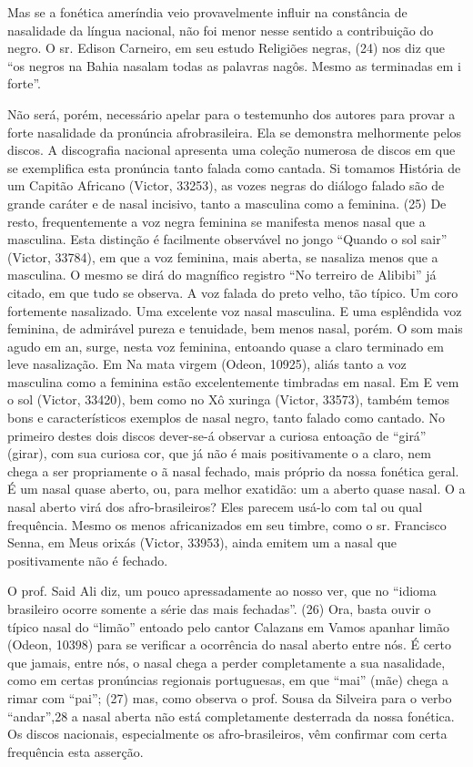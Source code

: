 Mas se a fonética ameríndia veio provavelmente influir na constância de
nasalidade da língua nacional, não foi menor nesse sentido a
contribuição do negro. O sr. Edison Carneiro, em seu estudo Religiões
negras, (24) nos diz que ``os negros na Bahia nasalam todas as palavras
nagôs. Mesmo as terminadas em i forte''.

Não será, porém, necessário apelar para o testemunho dos autores para
provar a forte nasalidade da pronúncia afrobrasileira. Ela se demonstra
melhormente pelos discos. A discografia nacional apresenta uma coleção
numerosa de discos em que se exemplifica esta pronúncia tanto falada
como cantada. Si tomamos História de um Capitão Africano (Victor,
33253), as vozes negras do diálogo falado são de grande caráter e de
nasal incisivo, tanto a masculina como a feminina. (25) De resto,
frequentemente a voz negra feminina se manifesta menos nasal que a
masculina. Esta distinção é facilmente observável no jongo ``Quando o
sol sair'' (Victor, 33784), em que a voz feminina, mais aberta, se
nasaliza menos que a masculina. O mesmo se dirá do magnífico registro
``No terreiro de Alibibi'' já citado, em que tudo se observa. A voz
falada do preto velho, tão típico. Um coro fortemente nasalizado. Uma
excelente voz nasal masculina. E uma esplêndida voz feminina, de
admirável pureza e tenuidade, bem menos nasal, porém. O som mais agudo
em an, surge, nesta voz feminina, entoando quase a claro terminado em
leve nasalização. Em Na mata virgem (Odeon, 10925), aliás tanto a voz
masculina como a feminina estão excelentemente timbradas em nasal. Em E
vem o sol (Victor, 33420), bem como no Xô xuringa (Victor, 33573),
também temos bons e característicos exemplos de nasal negro, tanto
falado como cantado. No primeiro destes dois discos dever-se-á observar
a curiosa entoação de ``girá'' (girar), com sua curiosa cor, que já não
é mais positivamente o a claro, nem chega a ser propriamente o ã nasal
fechado, mais próprio da nossa fonética geral. É um nasal quase aberto,
ou, para melhor exatidão: um a aberto quase nasal. O a nasal aberto virá
dos afro-brasileiros? Eles parecem usá-lo com tal ou qual frequência.
Mesmo os menos africanizados em seu timbre, como o sr. Francisco Senna,
em Meus orixás (Victor, 33953), ainda emitem um a nasal que
positivamente não é fechado.

O prof. Said Ali diz, um pouco apressadamente ao nosso ver, que no
``idioma brasileiro ocorre somente a série das mais fechadas''. (26)
Ora, basta ouvir o típico nasal do ``limão'' entoado pelo cantor
Calazans em Vamos apanhar limão (Odeon, 10398) para se verificar a
ocorrência do nasal aberto entre nós. É certo que jamais, entre nós, o
nasal chega a perder completamente a sua nasalidade, como em certas
pronúncias regionais portuguesas, em que ``mai'' (mãe) chega a rimar com
``pai''; (27) mas, como observa o prof. Sousa da Silveira para o verbo
``andar'',28 a nasal aberta não está completamente desterrada da nossa
fonética. Os discos nacionais, especialmente os afro-brasileiros, vêm
confirmar com certa frequência esta asserção.

